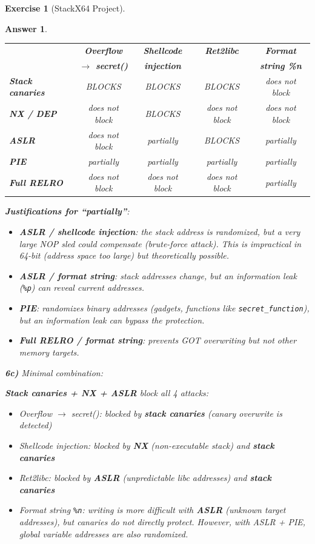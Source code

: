 \documentclass[a4paper,11pt]{article}
\theoremstyle{plain}
\newtheorem{correction}{Answer}
\theoremstyle{definition}
\newtheorem{exercice}{Exercise}
\begin{document}
\begin{exercice}[StackX64 Project]
\begin{correction}
\begin{center}
\begin{tabular}{l|c|c|c|c}
\toprule
& \textbf{Overflow} & \textbf{Shellcode} & \textbf{Ret2libc} & \textbf{Format} \\
& \textbf{$\to$ secret()} & \textbf{injection} & & \textbf{string \%n} \\
\midrule
\textbf{Stack canaries} & BLOCKS & BLOCKS & BLOCKS & does not block \\
\midrule
\textbf{NX / DEP} & does not block & BLOCKS & does not block & does not block \\
\midrule
\textbf{ASLR} & does not block & partially & BLOCKS & partially \\
\midrule
\textbf{PIE} & partially & partially & partially & partially \\
\midrule
\textbf{Full RELRO} & does not block & does not block & does not block & partially \\
\bottomrule
\end{tabular}
\end{center}

\textbf{Justifications for ``partially''}:
\begin{itemize}
    \item \textbf{ASLR / shellcode injection}: the stack address is randomized, but a very large NOP sled could compensate (brute-force attack). This is impractical in 64-bit (address space too large) but theoretically possible.
    \item \textbf{ASLR / format string}: stack addresses change, but an information leak (\texttt{\%p}) can reveal current addresses.
    \item \textbf{PIE}: randomizes binary addresses (gadgets, functions like \texttt{secret\_function}), but an information leak can bypass the protection.
    \item \textbf{Full RELRO / format string}: prevents GOT overwriting but not other memory targets.
\end{itemize}

\textbf{6c)} Minimal combination:

\textbf{Stack canaries + NX + ASLR} block all 4 attacks:
\begin{itemize}
    \item Overflow $\to$ secret(): blocked by \textbf{stack canaries} (canary overwrite is detected)
    \item Shellcode injection: blocked by \textbf{NX} (non-executable stack) and \textbf{stack canaries}
    \item Ret2libc: blocked by \textbf{ASLR} (unpredictable libc addresses) and \textbf{stack canaries}
    \item Format string \texttt{\%n}: writing is more difficult with \textbf{ASLR} (unknown target addresses), but canaries do not directly protect. However, with ASLR + PIE, global variable addresses are also randomized.
\end{itemize}


\end{correction}
\end{exercice}
\end{document}
